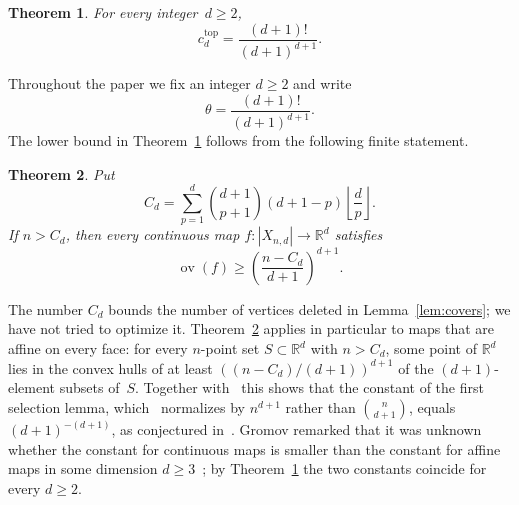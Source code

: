 \documentclass[11pt]{article}
\newtheorem{theorem}{Theorem}[section]
\theoremstyle{definition}
\numberwithin{equation}{section}
\newcommand{\R}{\mathbb R}
\DeclareMathOperator{\ov}{ov}
\begin{document}
\begin{theorem}\label{thm:main}
For every integer~$d\ge2$,
\begin{equation*}
 c_d^{\mathrm{top}}=\frac{(d+1)!}{(d+1)^{d+1}}.
\end{equation*}
\end{theorem}

Throughout the paper we fix an integer $d\ge2$ and write
\begin{equation*}
 \theta=\frac{(d+1)!}{(d+1)^{d+1}}.
\end{equation*}
The lower bound in Theorem~\ref{thm:main} follows from the following finite statement.

\begin{theorem}\label{thm:finite}
Put
\begin{equation}\label{eq:C}
 C_d=\sum_{p=1}^{d}\binom{d+1}{p+1}(d+1-p)\left\lfloor\frac dp\right\rfloor.
\end{equation}
If $n>C_d$, then every continuous map $f:|X_{n,d}|\to\R^d$ satisfies
\begin{equation*}
 \ov(f)\ge\left(\frac{n-C_d}{d+1}\right)^{d+1}.
\end{equation*}
\end{theorem}

The number $C_d$ bounds the number of vertices deleted in Lemma~\ref{lem:covers}; we have not tried to optimize it. Theorem~\ref{thm:finite} applies in particular to maps that are affine on every face: for every $n$-point set $S\subset\R^d$ with $n>C_d$, some point of $\R^d$ lies in the convex hulls of at least $((n-C_d)/(d+1))^{d+1}$ of the $(d+1)$-element subsets of~$S$. Together with~\cite[Theorem~1.3]{BMN} this shows that the constant of the first selection lemma, which~\cite{BMN} normalizes by $n^{d+1}$ rather than $\binom n{d+1}$, equals $(d+1)^{-(d+1)}$, as conjectured in~\cite[\S6]{BMN}. Gromov remarked that it was unknown whether the constant for continuous maps is smaller than the constant for affine maps in some dimension $d\ge3$~\cite[p.~419]{Gromov}; by Theorem~\ref{thm:main} the two constants coincide for every $d\ge2$.
\end{document}
